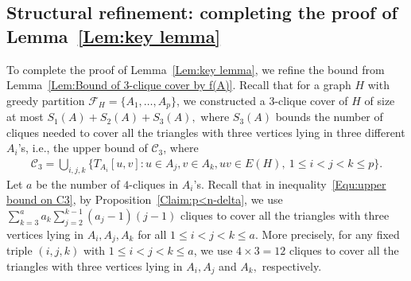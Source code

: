 \documentclass[11pt,a4paper]{article}
\newcommand{\dC}{{\mathcal{C}}}
\begin{document}
\subsection{Structural refinement: completing the proof of Lemma~\ref{Lem:key lemma}}\label{Sec:Proof of better upperbound lemma}
To complete the proof of Lemma~\ref{Lem:key lemma}, we refine the bound from Lemma~\ref{Lem:Bound of 3-clique cover by f(A)}. 
Recall that for a graph $H$ with greedy partition $\mathcal{F}_H = \{A_1,\dots,A_p\}$, 
we constructed a $3$-clique cover of $H$ of size at most $S_1(A)+S_2(A)+S_3(A),$ 
where $S_3(A)$ bounds the number of cliques needed to cover all the triangles with three vertices lying in three different $A_i$'s, i.e., the upper bound of $\dC_3$, where  
\begin{align*}
\dC_3=\bigcup\limits_{i,j,k} \{T_{A_i}[u,v]: u\in A_j, v\in A_k, uv\in E(H),\ 1\le i< j<k\le p\}.
\end{align*}
Let $a$ be the number of $4$-cliques in $A_i$'s. 
Recall that in inequality~\eqref{Equ:upper bound on C3},
by Proposition~\ref{Claim:p<n-delta},
we use $\sum_{k=3}^{a} a_k \sum_{j=2}^{k-1} (a_j-1) (j-1)$ cliques
to cover all the triangles with three vertices lying in $A_i, A_j,A_k$ for all $1\leq i<j<k\le a.$
More precisely, for any fixed triple $(i,j,k)$ with $1\leq i<j<k\le a$, 
we use $4\times3=12$ cliques to cover all the triangles with three vertices lying in $A_i, A_j$ and $A_k,$ respectively. 
\end{document}

